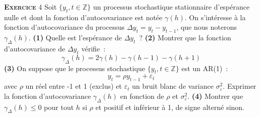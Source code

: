 \documentclass[10pt,a4paper,notitlepage,twocolumn]{article}
\newcommand{\exercice}[1]{\textsc{\textbf{Exercice}} #1}
\newcommand{\question}[1]{\textbf{(#1)}}
\begin{document}
\exercice{4} Soit $\{y_t, t\in \mathbb Z\}$ un processus stochastique
stationnaire d'espérance nulle et dont la fonction d'autocovariance
est notée $\gamma(h)$. On s'intéresse à la fonction d'autocovariance
du processus $\Delta y_t = y_t-y_{t-1}$, que nous
noterons $\gamma_{\Delta}(h)$. \question{1} Quelle est l'espérance de $\Delta y_t$~? \question{2} Montrer que la fonction d'autocovariance de $\Delta y_t$ vérifie~:
\[
\gamma_{\Delta}(h) = 2\gamma(h)-\gamma(h-1)-\gamma(h+1)
\]
\question{3} On suppose que le processus stochastique  $\{y_t, t\in \mathbb Z\}$ est un AR(1)~:
\[
y_t = \rho y_{t-1} + \varepsilon_t
\]
avec $\rho$ un réel entre -1 et 1 (exclus) et $\varepsilon_t$ un bruit blanc de variance $\sigma_{\varepsilon}^2$. Exprimer
la fonction d'autocovariance $\gamma_{\Delta}(h)$ en fonction de $\rho$ et $\sigma_{\varepsilon}^2$. \question{4} Montrer que $\gamma_{\Delta}(h)\leq 0$ pour tout $h$ si
$\rho$ et positif et inférieur à 1, de signe alterné sinon.
\end{document}
